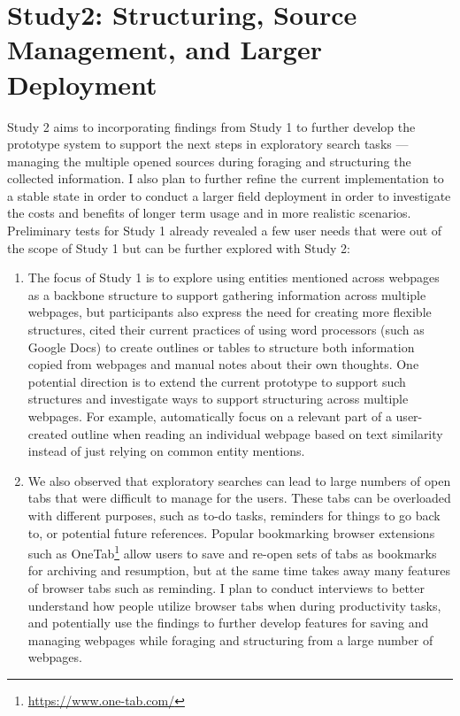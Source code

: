 
\section{Study2: Structuring, Source Management, and Larger Deployment}

Study 2 aims to incorporating findings from Study 1 to further develop the prototype system to support the next steps in exploratory search tasks --- managing the multiple opened sources during foraging and structuring the collected information. I also plan to further refine the current implementation to a stable state in order to conduct a larger field deployment in order to investigate the costs and benefits of longer term usage and in more realistic scenarios. Preliminary tests for Study 1 already revealed a few user needs that were out of the scope of Study 1 but can be further explored with Study 2:

\begin{enumerate}[label=\alph*)]
    \item The focus of Study 1 is to explore using entities mentioned across webpages as a backbone structure to support gathering information across multiple webpages, but participants also express the need for creating more flexible structures, cited their current practices of using word processors (such as Google Docs) to create outlines or tables to structure both information copied from webpages and manual notes about their own thoughts. One potential direction is to extend the current prototype to support such structures and investigate ways to support structuring across multiple webpages. For example, automatically focus on a relevant part of a user-created outline when reading an individual webpage based on text similarity instead of just relying on common entity mentions. 
    \item We also observed that exploratory searches can lead to large numbers of open tabs that were difficult to manage for the users. These tabs can be overloaded with different purposes, such as to-do tasks, reminders for things to go back to, or potential future references. Popular bookmarking browser extensions such as OneTab\footnote{\url{https://www.one-tab.com/}} allow users to save and re-open sets of tabs as bookmarks for archiving and resumption, but at the same time takes away many features of browser tabs such as reminding.
    I plan to conduct interviews to better understand how people utilize browser tabs when during productivity tasks, and potentially use the findings to further develop features for saving and managing webpages while foraging and structuring from a large number of webpages. 
\end{enumerate}

